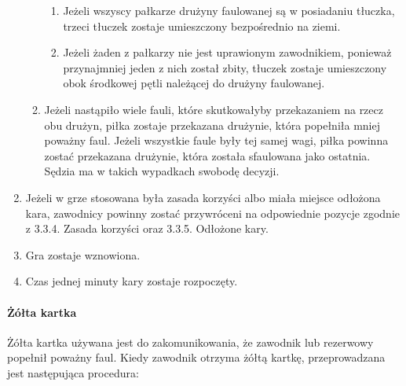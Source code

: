\documentclass[12pt]{article}
\begin{document}
\begin{enumerate}
\begin{enumerate}
    \begin{enumerate}
    \item
            Jeżeli wszyscy pałkarze drużyny faulowanej są w posiadaniu
      tłuczka, trzeci tłuczek zostaje umieszczony bezpośrednio na ziemi.
          \item
            Jeżeli żaden z pałkarzy nie jest uprawionym zawodnikiem, ponieważ
      przynajmniej jeden z nich został zbity, tłuczek zostaje
      umieszczony obok środkowej pętli należącej do drużyny faulowanej.
          \end{enumerate}
  \item
        Jeżeli nastąpiło wiele fauli, które skutkowałyby przekazaniem na
    rzecz obu drużyn, piłka zostaje przekazana drużynie, która popełniła
    mniej poważny faul. Jeżeli wszystkie faule były tej samej wagi,
    piłka powinna zostać przekazana drużynie, która została sfaulowana
    jako ostatnia. Sędzia ma w takich wypadkach swobodę decyzji.
      \end{enumerate}
\item
    Jeżeli w grze stosowana była zasada korzyści albo miała miejsce
  odłożona kara, zawodnicy powinny zostać przywróceni na odpowiednie
  pozycje zgodnie z 3.3.4. Zasada korzyści oraz 3.3.5. Odłożone kary.
  \item
    Gra zostaje wznowiona.
  \item
    Czas jednej minuty kary zostaje rozpoczęty.
  \end{enumerate}

\paragraph{Żółta kartka}
Żółta kartka używana jest do
zakomunikowania, że zawodnik lub rezerwowy popełnił poważny faul. Kiedy
zawodnik otrzyma żółtą kartkę, przeprowadzana jest następująca
procedura:
\end{document}

